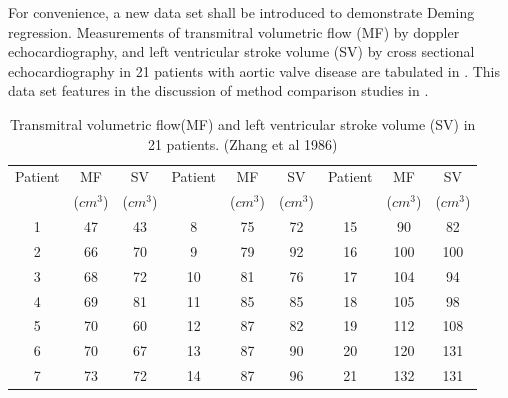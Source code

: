 \documentclass[12pt, a4paper]{report}
\theoremstyle{plain}
\theoremstyle{definition}
\theoremstyle{remark}
\begin{document}
	For convenience, a new data set shall be introduced to demonstrate
	Deming regression. Measurements of transmitral volumetric flow
	(MF) by doppler echocardiography, and left ventricular stroke
	volume (SV) by cross sectional echocardiography in 21 patients
	with aortic valve disease are tabulated in \citet{zhang}. This
	data set features in the discussion of method comparison studies
	in \citet[p.398]{AltmanBook} .
	
	
	\begin{table}[h!]
		\begin{center}
			\begin{tabular}{|c|c|c||c|c|c||c|c|c|}
				\hline
				Patient & MF  & SV  & Patient & MF  & SV  & Patient & MF  & SV \\
				&($cm^{3}$)&  ($cm^{3}$) & &($cm^{3}$)&  ($cm^{3}$) & &($cm^{3}$)&  ($cm^{3}$)
				\\
				\hline
				1 & 47 & 43 &  8 & 75 & 72 &  15 & 90 & 82 \\
				2 & 66 & 70 & 9 & 79 & 92 &  16 & 100 & 100 \\
				3 & 68 & 72 & 10 & 81 & 76 & 17 & 104 & 94 \\
				4 & 69 & 81 & 11 & 85 & 85 &  18 & 105 & 98 \\
				5 & 70 & 60 & 12 & 87 & 82 & 19 & 112 & 108 \\
				6 & 70 & 67 & 13 & 87 & 90 & 20 & 120 & 131 \\
				7 & 73 & 72 & 14 & 87 & 96 &  21 & 132 & 131 \\
				
				\hline
			\end{tabular}
			\caption{Transmitral volumetric flow(MF) and left ventricular
				stroke volume (SV) in 21 patients. (Zhang et al 1986)}
		\end{center}
	\end{table}
	
\end{document}
